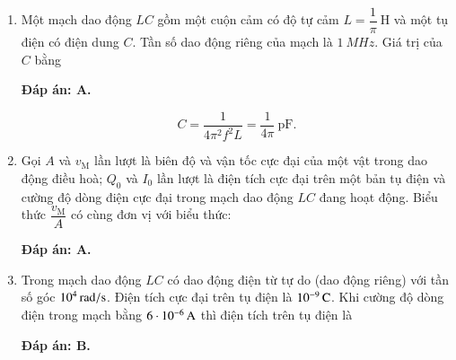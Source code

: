 \begin{enumerate}[label=\bfseries Câu \arabic*:]
	

		\item {} 
	
	{ Một mạch dao động $LC$ gồm một cuộn cảm có độ tự cảm $L=\dfrac{1}{\pi}\ \text{H}$ và một tụ điện có điện dung $C$. Tần số dao động riêng của mạch là $\SI{1}{MHz}$. Giá trị của $C$ bằng
		
	}
	\hideall
	{		\textbf{Đáp án: A.}
		
		$$C= \dfrac{1}{4\pi^2f^2 L}  = \dfrac{1}{4\pi}\ \text{pF}.$$
		
	}
		\item {} 
	
	{ Gọi $A$ và $v_\text{M}$ lần lượt là biên độ và vận tốc cực đại của một vật trong dao động điều hoà; $Q_0$ và $I_0$ lần lượt là điện tích cực đại trên một bản tụ điện và cường độ dòng điện cực đại trong mạch dao động $LC$ đang hoạt động. Biểu thức $\dfrac{v_\text{M}}{A}$ có cùng đơn vị với biểu thức:
		
	}
	\hideall
	{		\textbf{Đáp án: A.}
		
		
		
	}
		\item {} 
	
	{ Trong mạch dao động $LC$ có dao động điện từ tự do (dao động riêng) với tần số góc $\xsi{10^4}{rad/s}$. Điện tích cực đại trên tụ điện là  $\xsi{10^{-9}}{C}$. Khi cường độ dòng điện trong mạch bằng $\xsi{6\cdot 10^{-6}}{A}$ thì điện tích trên tụ điện là
		
	}
	\hideall
	{		\textbf{Đáp án: B.}
		
}
\end{enumerate}
